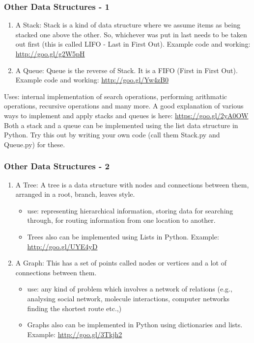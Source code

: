 \documentclass{beamer}
\begin{document}
\begin{frame}
\frametitle{Other Data Structures - 1} %
\begin{enumerate}
\item A Stack: Stack is a kind of data structure where we assume items as being stacked one above the other. So, whichever was put in last needs to be taken out first (this is called LIFO - Last in First Out). Example code and working: \url{http://goo.gl/g2W5pH} \pause
\item A Queue: Queue is the reverse of Stack. It is a FIFO (First in First Out). Example code and working: \url{http://goo.gl/Yw4zB0}
\end{enumerate}
\pause
Uses: internal implementation of search operations, performing arithmatic operations, recursive operations and many more. A good explanation of various ways to implement and apply stacks and queues is here: \url{https://goo.gl/2yA0OW}
\pause
\\ Both a stack and a queue can be implemented using the list data structure in Python. Try this out by writing your own code (call them Stack.py and Queue.py) for these. 
\end{frame}

\begin{frame}
\frametitle{Other Data Structures - 2}
\begin{enumerate}
\item A Tree: A tree is a data structure with nodes and connections between them, arranged in a root, branch, leaves style.
\begin{itemize}
\item use: representing hierarchical information, storing data for searching through, for routing information from one location to another.
\item Trees also can be implemented using Lists in Python. Example: \url{http://goo.gl/UYE4yD}
\end{itemize} \pause
\item A Graph: This has a set of points called nodes or vertices and a lot of connections between them.
\begin{itemize}
\item use: any kind of problem which involves a network of relations (e.g., analysing social network, molecule interactions, computer networks 
finding the shortest route etc.,)
\item Graphs also can be implemented in Python using dictionaries and lists. Example: \url{http://goo.gl/3Tkjh2}
\end{itemize}
\end{enumerate}
\end{frame}
\end{document}
